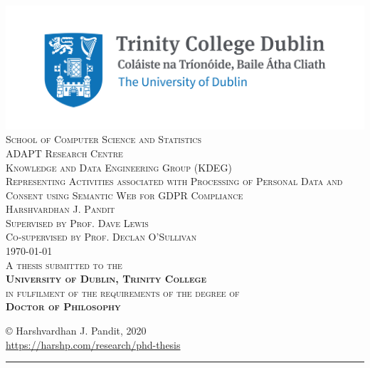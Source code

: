 \pagestyle{empty}
\begin{center}
\scshape
    \includegraphics{img/TCD_logo.png}\\[1cm] 
\large School of Computer Science and Statistics \\[0.25cm]
\small ADAPT Research Centre \\
\small Knowledge and Data Engineering Group (KDEG) \\[1.5cm]

\huge Representing Activities associated with Processing of Personal Data and Consent using Semantic Web for GDPR Compliance \\[1.5cm]
 
\Large Harshvardhan J. Pandit \\[1cm]

\large 
Supervised by Prof. Dave Lewis \\
Co-supervised by Prof. Declan O'Sullivan \\[1cm]

{\small \today}\\[2cm]

\normalsize
A thesis submitted to the \\
\textbf{University of Dublin, Trinity College} \\
in fulfilment of the requirements of the degree of \\
\textbf{Doctor of Philosophy}

\normalsize

\vfill %
\end{center}
\restoregeometry

\cleardoublepage

\clearpage
\vspace*{\fill}
\begin{center}
    \centering
    \copyright\hspace{0.25cm} Harshvardhan J. Pandit, 2020\\
    \url{https://harshp.com/research/phd-thesis}
    \rule{\textwidth}{1pt}
    \doclicenseThis
\end{center}
\vfill
\clearpage

